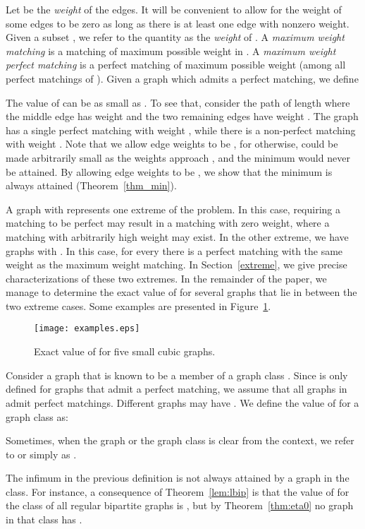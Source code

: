 \documentclass{article}
\begin{document}
Let  be the \emph{weight} of the edges. It will be convenient to allow for the weight of some edges to be zero as long as there is at least one edge with nonzero weight. Given a subset , we refer to the quantity  as the \emph{weight} of . A \emph{maximum weight matching} is a matching  of maximum possible weight in . A \emph{maximum weight perfect matching} is a perfect matching  of maximum possible weight (among all perfect matchings of ). Given a graph  which admits a perfect matching, we define


The value of  can be as small as . To see that, consider the path of length  where the middle edge has weight  and the two remaining edges have weight .  The graph  has a single perfect matching  with weight , while there is a non-perfect matching with weight . Note that we allow edge weights to be , for otherwise,  could be made arbitrarily small as the weights approach , and the minimum would never be attained. By allowing edge weights to be , we show that the minimum is always attained (Theorem~\ref{thm_min}).

A graph  with  represents one extreme of the problem. In this case, requiring a matching to be perfect may result in a matching with zero weight, where a matching with arbitrarily high weight may exist. In the other extreme, we have graphs  with . In this case, for every  there is a perfect matching with the same weight as the maximum weight matching. In Section~\ref{extreme}, we give precise characterizations of these two extremes. In the remainder of the paper, we manage to determine the exact value of  for several graphs that lie in between the two extreme cases. Some examples are presented in Figure~\ref{fig:examples}.

\begin{figure}[t]
\centering
\texttt{[image: examples.eps]}
\caption{Exact value of  for five small cubic graphs.}
\label{fig:examples}
\end{figure}

Consider a graph  that is known to be a member of a graph class . Since  is only defined for graphs that admit a perfect matching, we assume that all graphs in  admit perfect matchings. Different graphs  may have . We define the value of  for a graph class  as:

Sometimes, when the graph  or the graph class  is clear from the context, we refer to  or  simply as .

The infimum in the previous definition is not always attained by a graph in the class. For instance, a consequence of Theorem~\ref{lem:lbip} is that the value of  for the class of all regular bipartite graphs is , but by Theorem~\ref{thm:eta0} no graph in that class has .
\end{document}
